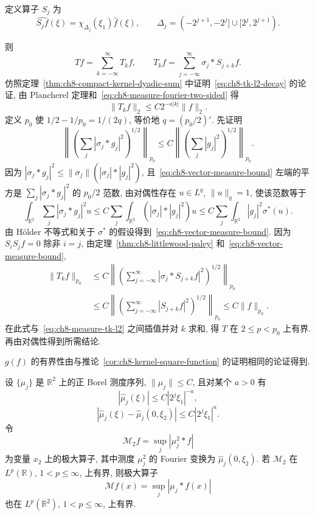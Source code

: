 \begin{Proof}
定义算子 $S_j$ 为
\[
 \widehat{S_jf}(\xi)=\chi_{\Delta_j}(\xi_1)\widehat f(\xi),
 \qquad
 \Delta_j=(-2^{j+1},-2^j]\cup[2^j,2^{j+1}).
\]

\hypertarget{chapter-08-page-193}{}
则
\[
 Tf=\sum_{k=-\infty}^{\infty}T_kf,
 \qquad
 T_kf=\sum_{j=-\infty}^{\infty}\sigma_j*S_{j+k}f.
\]
仿照定理~\ref{thm:ch8-compact-kernel-dyadic-sum} 中证明~\eqref{eq:ch8-tk-l2-decay} 的论证, 由 Plancherel 定理和~\eqref{eq:ch8-measure-fourier-two-sided} 得
\begin{equation}
 \|T_kf\|_2\le C2^{-a|k|}\|f\|_2.
 \label{eq:ch8-measure-tk-l2}
\end{equation}
定义 $p_0$ 使 $1/2-1/p_0=1/(2q)$, 等价地 $q=(p_0/2)'$. 先证明
\begin{equation}
 \left\|\left(\sum_j|\sigma_j*g_j|^2\right)^{1/2}\right\|_{p_0}
 \le C\left\|\left(\sum_j|g_j|^2\right)^{1/2}\right\|_{p_0}.
 \label{eq:ch8-vector-measure-bound}
\end{equation}
因为 $|\sigma_j*g_j|^2\le\|\sigma_j\|(|\sigma_j|*|g_j|^2)$, 且~\eqref{eq:ch8-vector-measure-bound} 左端的平方是 $\sum_j|\sigma_j*g_j|^2$ 的 $p_0/2$ 范数, 由对偶性存在 $u\in L^q$, $\|u\|_q=1$, 使该范数等于
\[
 \int_{\mathbb R^2}\sum_j|\sigma_j*g_j|^2u
 \le C\sum_j\int_{\mathbb R^2}(|\sigma_j|*|g_j|^2)u
 \le C\sum_j\int_{\mathbb R^2}|g_j|^2\sigma^*(u).
\]
由 Hölder 不等式和关于 $\sigma^*$ 的假设得到~\eqref{eq:ch8-vector-measure-bound}. 因为 $S_iS_jf=0$ 除非 $i=j$, 由定理~\ref{thm:ch8-littlewood-paley} 和~\eqref{eq:ch8-vector-measure-bound},
\[
 \begin{aligned}
 \|T_kf\|_{p_0}
 &\le C\left\|\left(\sum_{j=-\infty}^{\infty}
 |\sigma_j*S_{j+k}f|^2\right)^{1/2}\right\|_{p_0}\\
 &\le C\left\|\left(\sum_{j=-\infty}^{\infty}|S_{j+k}f|^2\right)^{1/2}\right\|_{p_0}
 \le C\|f\|_{p_0}.
\end{aligned}
\]
在此式与~\eqref{eq:ch8-measure-tk-l2} 之间插值并对 $k$ 求和, 得 $T$ 在 $2\le p<p_0$ 上有界. 再由对偶性得到所需结论.

$g(f)$ 的有界性由与推论~\ref{cor:ch8-kernel-square-function} 的证明相同的论证得到.
\end{Proof}

\hypertarget{chapter-08-page-194}{}
\begin{Theorem}
\label{thm:ch8-parabolic-measure-maximal}
设 $\{\mu_j\}$ 是 $\mathbb R^2$ 上的正 Borel 测度序列, $\|\mu_j\|\le C$, 且对某个 $a>0$ 有
\begin{equation}
 |\widehat\mu_j(\xi)|\le C|2^j\xi_1|^{-a},
 \label{eq:ch8-mu-fourier-decay}
\end{equation}
\begin{equation}
 |\widehat\mu_j(\xi)-\widehat\mu_j(0,\xi_2)|
 \le C|2^j\xi_1|^a.
 \label{eq:ch8-mu-fourier-difference}
\end{equation}
令
\[
 \mathcal M_2f=\sup_j|\mu_j^2*f|
\]
为变量 $x_2$ 上的极大算子, 其中测度 $\mu_j^2$ 的 Fourier 变换为 $\widehat\mu_j(0,\xi_2)$. 若 $\mathcal M_2$ 在 $L^p(\mathbb R)$, $1<p\le\infty$, 上有界, 则极大算子
\[
 \mathcal Mf(x)=\sup_j|\mu_j*f(x)|
\]
也在 $L^p(\mathbb R^2)$, $1<p\le\infty$, 上有界.
\end{Theorem}

